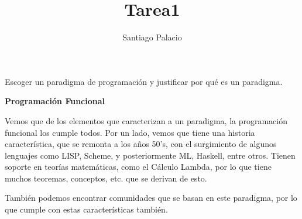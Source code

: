 \documentclass[a4paper,12pt]{article}
\title{Tarea1}
\author{Santiago Palacio}
\begin{document}
\maketitle

Escoger un paradigma de programación y justificar por qué es un paradigma.

\textbf{Programación Funcional}

Vemos que de los elementos que caracterizan a un paradigma, la programación funcional los cumple todos. Por un lado, vemos que tiene una historia característica, que se remonta a los años 50's, con el surgimiento de algunos lenguajes como LISP, Scheme, y posteriormente ML, Haskell, entre otros. Tienen soporte en teorías matemáticas, como el Cálculo Lambda, por lo que tiene muchos teoremas, conceptos, etc. que se derivan de esto. 

También podemos encontrar comunidades que se basan en este paradigma, por lo que cumple con estas características también.
\end{document}
